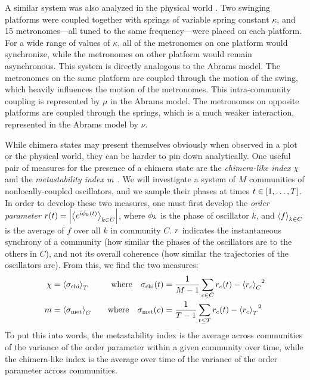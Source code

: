 A similar system was also analyzed in the physical world \cite{Martens2013}.
Two swinging platforms were coupled together with springs of variable spring constant $\kappa$, and 15 metronomes---all tuned to the same frequency---were placed on each platform.
For a wide range of values of $\kappa$, all of the metronomes on one platform would synchronize, while the metronomes on other platform would remain asynchronous.
This system is directly analogous to the Abrams model.
The metronomes on the same platform are coupled through the motion of the swing, which heavily influences the motion of the metronomes.
This intra-community coupling is represented by $\mu$ in the Abrams model.
The metronomes on opposite platforms are coupled through the springs, which is a much weaker interaction, represented in the Abrams model by $\nu$.

While chimera states may present themselves obviously when observed in a plot or the physical world, they can be harder to pin down analytically.
One useful pair of measures for the presence of a chimera state are the \textit{chimera-like index} $\chi$ and the \textit{metastability index} $m$ \cite{Shanahan2010,Hizanidis2016}.
We will investigate a system of $M$ communities of nonlocally-coupled oscillators, and we sample their phases at times $t \in \bqty{1, \ldots, T}$.
In order to develop these two measures, one must first develop the \textit{order parameter} $r(t) = \abs{\expval{e^{i \phi_{k}(t)}}_{k \in C}}$, where $\phi_{k}$ is the phase of oscillator $k$, and $\ev{f}_{k \in C}$ is the average of $f$ over all $k$ in community $C$.
$r$ indicates the instantaneous synchrony of a community (how similar the phases of the oscillators are to the others in $C$), and not its overall coherence (how similar the trajectories of the oscillators are).
From this, we find the two measures:
\begin{align}
  \label{eq:chimera}
  \chimera
  &=
    \expval{\sigma_{\text{chi}}}_{T}
  &
    \qq{where}
    \sigma_{\text{chi}}(t)
  &=
    \frac{1}{M - 1} \sum_{c \in C}{\ordparam_{c}(t) - \expval{\ordparam_{c}}_{C}}^{2} \\
  \label{eq:metastability}
  \meta
  &=
    \expval{\sigma_{\text{met}}}_{C}
  &
    \qq{where}
    \sigma_{\text{met}}(c)
  &=
    \frac{1}{T - 1} \sum_{t \leq T}{\ordparam_{c}(t) - \expval{\ordparam_{c}}_{T}}^{2}
\end{align}
To put this into words, the metastability index is the average across communities of the variance of the order parameter within a given community over time, while the chimera-like index is the average over time of the variance of the order parameter across communities.

